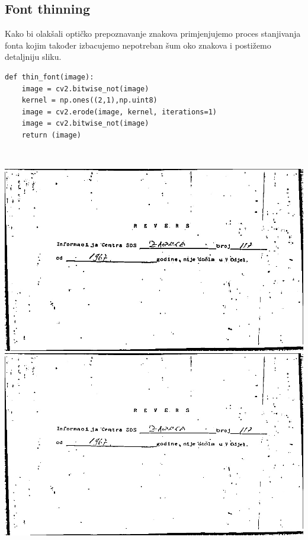 \documentclass{article}
\begin{document}
\subsection{Font thinning}

Kako bi olakšali optičko prepoznavanje znakova primjenjujemo proces stanjivanja fonta kojim također izbacujemo nepotreban šum oko znakova i postižemo detaljniju sliku. %
\\

\begin{lstlisting}
def thin_font(image):
    image = cv2.bitwise_not(image)
    kernel = np.ones((2,1),np.uint8)
    image = cv2.erode(image, kernel, iterations=1)
    image = cv2.bitwise_not(image)
    return (image)
\end{lstlisting}
\\
\begin{center}
    \includegraphics[scale=0.2]{Z05353721_adatpive.jpg}
    \includegraphics[scale=0.2]{Z05353721_thin.jpg}
\end{center}
\end{document}
